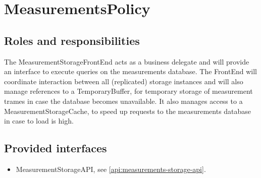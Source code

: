 \section{MeasurementsPolicy}
\label{element:measurements-policy}

\subsection{Roles and responsibilities}

\npar The MeasurementStorageFrontEnd acts as a business delegate and will
provide an interface to execute queries on the measurements database. The
FrontEnd will coordinate interaction between all (replicated) storage instances
and will also manage references to a TemporaryBuffer, for temporary storage of
measurement trames in case the database becomes unavailable. It also manages
access to a MeasurementStorageCache, to speed up requests to the measurements
database in case to load is high.

\subsection{Provided interfaces}

\begin{itemize}
  \item MeasurementStorageAPI, see \ref{api:measurements-storage-api}.
\end{itemize}